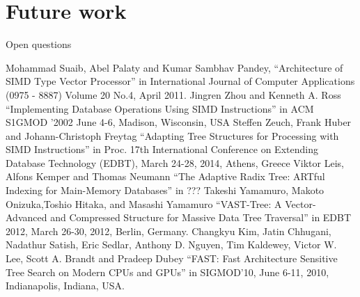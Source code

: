 \documentclass[conference]{IEEEtran}
\begin{document}
\section{Future work}
Open questions
\begin{thebibliography}{00}
Mohammad Suaib, Abel Palaty and Kumar Sambhav Pandey, ``Architecture of SIMD Type Vector Processor'' in International Journal of Computer Applications (0975 - 8887) Volume 20 No.4, April 2011.
 Jingren Zhou and Kenneth A. Ross  ``Implementing Database Operations Using SIMD Instructions'' in ACM S1GMOD '2002 June 4-6, Madison, Wisconsin, USA
 Steffen Zeuch, Frank Huber and Johann-Christoph Freytag  ``Adapting Tree Structures for Processing with SIMD Instructions'' in Proc. 17th International Conference on Extending Database Technology (EDBT), March 24-28, 2014, Athens, Greece
 Viktor Leis, Alfons Kemper and Thomas Neumann ``The Adaptive Radix Tree: ARTful Indexing for Main-Memory Databases'' in ???
 Takeshi Yamamuro, Makoto Onizuka,Toshio Hitaka, and Masashi Yamamuro ``VAST-Tree: A Vector-Advanced and Compressed Structure for Massive Data Tree Traversal'' in EDBT 2012, March 26-30, 2012, Berlin, Germany.
 Changkyu Kim, Jatin Chhugani, Nadathur Satish, Eric Sedlar, Anthony D. Nguyen,
Tim Kaldewey, Victor W. Lee, Scott A. Brandt and Pradeep Dubey ``FAST: Fast Architecture Sensitive Tree Search
on Modern CPUs and GPUs'' in SIGMOD’10, June 6-11, 2010, Indianapolis, Indiana, USA.
\end{thebibliography}
\end{document}
